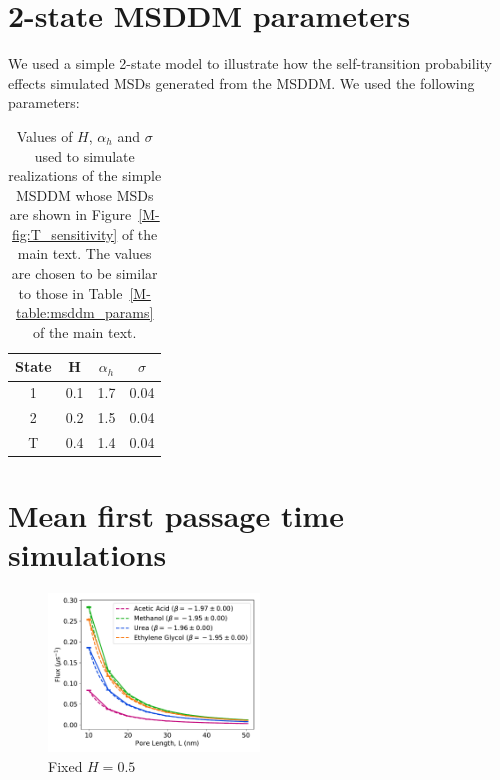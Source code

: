 \documentclass{article}
\begin{document}
  
  \section{2-state MSDDM parameters}\label{section:simple_msddm_params}
  
  We used a simple 2-state model to illustrate how the self-transition probability 
  effects simulated MSDs generated from the MSDDM. We used the following parameters:
  
  \begin{table}[h]
  \centering
  \begin{tabular}{|c|c|c|c|}
  \hline
  State & H     & $\alpha_h$ & $\sigma$ \\\hline
  1     & 0.1  & 1.7       & 0.04    \\
  2     & 0.2  & 1.5       & 0.04    \\
  T     & 0.4  & 1.4       & 0.04    \\\hline
  \end{tabular}
  \caption{Values of $H$, $\alpha_h$ and $\sigma$ used to simulate realizations
  of the simple MSDDM whose MSDs are shown in Figure~\ref{M-fig:T_sensitivity} of
  the main text. The values are chosen to be similar to those in Table~\ref{M-table:msddm_params}
  of the main text.}\label{table:msddm_params}
  \end{table}
  
  \section{Mean first passage time simulations}\label{section:mfpt}
  

  \begin{figure}
  \centering
  \includegraphics[width=0.5\textwidth]{flux_curves_brownian.pdf}
  \caption{Fixed $H=0.5$}\label{fig:flux_curves_brownian}
  \end{figure}
  
\end{document}
